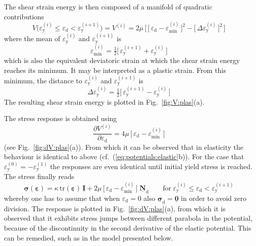 \documentclass[times,namecite]{goose-article}
\newcommand\T[1]{\underline{\bm{{#1}}}}
\begin{document}
The shear strain energy is then composed of a manifold of quadratic contributions
\begin{equation}\label{eq:V-plas}
  V \big(
    \varepsilon_\mathrm{y}^{(i)} \leq \varepsilon_\mathrm{d} < \varepsilon_\mathrm{y}^{(i+1)}
  \big)
  =
  V^{(i)}
  =
  2 \mu \, \bigg[\,
    \Big[\, \varepsilon_\mathrm{d} - \varepsilon_\mathrm{min}^{(i)} \,\Big]^2
    -
    \Big[\, \Delta \varepsilon_\mathrm{y}^{(i)} \,\Big]^2
  \,\bigg]
\end{equation}
where the mean of $\varepsilon_\mathrm{y}^{(i)}$ and $\varepsilon_\mathrm{y}^{(i+1)}$ is
\begin{equation}
  \varepsilon_\mathrm{min}^{(i)}
  =
  \tfrac{1}{2} \Big[\, \varepsilon_\mathrm{y}^{(i+1)} + \varepsilon_\mathrm{y}^{(i)} \,\Big]
\end{equation}
which is also the equivalent deviatoric strain at which the shear strain energy reaches its minimum. It may be interpreted as a plastic strain. From this minimum, the distance to $\varepsilon_\mathrm{y}^{(i)}$ and $\varepsilon_\mathrm{y}^{(i+1)}$ is
\begin{equation}
  \Delta \varepsilon_\mathrm{y}^{(i)}
  =
  \tfrac{1}{2} \Big[\, \varepsilon_\mathrm{y}^{(i+1)} - \varepsilon_\mathrm{y}^{(i)} \,\Big]
\end{equation}
The resulting shear strain energy is plotted in Fig.~\ref{fig:V:plas}(a).

The stress response is obtained using
\begin{equation}\label{eq:dV-plas}
  \frac{\partial V^{(i)}}{\partial \varepsilon_\mathrm{d}}
  =
  4 \mu \, \Big[\, \varepsilon_\mathrm{d} - \varepsilon_\mathrm{min}^{(i)} \,\Big]
\end{equation}
(see Fig.~\ref{fig:dV:plas}(a)). From which it can be observed that in elasticity the behaviour is identical to above (cf.~(\ref{eq:potentials:elastic}b)). For the case that $\varepsilon_\mathrm{y}^{(0)} = - \varepsilon_\mathrm{y}^{(1)}$ the responses are even identical until initial yield stress is reached. The stress finally reads
\begin{equation}
  \T{\sigma} ( \T{\varepsilon} )
  =
  \kappa \, \mathrm{tr} ( \T{\varepsilon} ) \, \T{I}
  +
  2 \mu \, \Big[\, \varepsilon_\mathrm{d} - \varepsilon_\mathrm{min}^{(i)} \,\Big] \;
  \T{N}_\mathrm{d}
  \qquad
  \mathrm{for}
  \;
  \varepsilon_\mathrm{y}^{(i)} \leq \varepsilon_\mathrm{d} < \varepsilon_\mathrm{y}^{(i+1)}
\end{equation}
whereby one has to assume that when $\varepsilon_\mathrm{d} = 0$ also $\T{\sigma}_\mathrm{d} = \T{0}$ in order to avoid zero division. The response is plotted in Fig.~\ref{fig:dV:plas}(a), from which it is observed that it exhibits stress jumps between different parabola in the potential, because of the discontinuity in the second derivative of the elastic potential. This can be remedied, such as in the model presented below.
\end{document}

